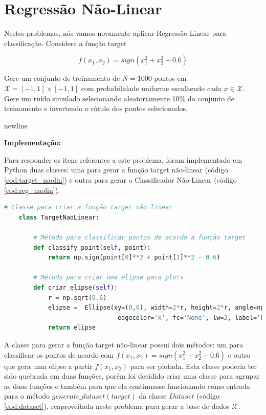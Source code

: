 \section{Regressão Não-Linear}

Nestes problemas, nós vamos novamente aplicar Regressão Linear para classificação. Considere a função target

$$f(x_1,x_2) = sign(x_1^2 + x_2^2 - 0.6) $$

Gere um conjunto de treinamento de $N = 1000$ pontos em $\mathcal{X} = [-1, 1] \times [-1, 1]$ com probabilidade uniforme escolhendo cada $x \in \mathcal{X}$. Gere um ruído simulado selecionando aleatoriamente 10\% do conjunto de treinamento e invertendo o rótulo dos pontos selecionados.

newline \par
\textbf{Implementação:}

Para responder os itens referentes a este problema, foram implementado em Python duas classes: uma para gerar a função target não-linear (código \ref{cod:target_naolin}) e outra para gerar o Classificador Não-Linear (código \ref{cod:reg_naolin}). 

\begin{lstlisting}[language=Python, caption=Target Não-Linear, label=cod:target_naolin]
    # Classe para criar a função target não linear
    class TargetNaoLinear:
    
        # Método para classificar pontos de acordo a função target
        def classify_point(self, point): 
            return np.sign(point[0]**2 + point[1]**2 - 0.6)
        
        # Método para criar uma elipse para plots
        def criar_elipse(self):
            r = np.sqrt(0.6)
            elipse =  Ellipse(xy=(0,0), width=2*r, height=2*r, angle=np.degrees(0),
                               edgecolor='k', fc='None', lw=2, label='Função Target (f)')
            return elipse
\end{lstlisting}

A classe para gerar a função target não-linear possui dois métodos: um para classificar os pontos de acordo com $f(x_1,x_2) = sign(x_1^2 + x_2^2 - 0.6) $ e outro que gera uma elipse a partir $f(x_1,x_2)$ para ser plotada. Esta classe poderia ter sido quebrada em duas funções, porém foi decidido criar uma classe para agrupar as duas funções e também para que ela continuasse funcionando como entrada para o método $generate\_dataset(target)$ da classe $Dataset$ (código \ref{cod:dataset}), reaproveitada neste problema para gerar a base de dados $\mathcal{X}$.

